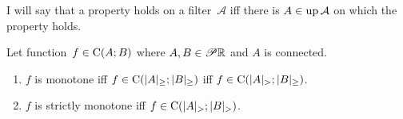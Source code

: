 I will say that a property holds on a filter~$\mathcal{A}$ iff there is $A\in\operatorname{up}\mathcal{A}$ on which the property holds.


\begin{lem}
Let function~$f\in\mathrm{C}(A;B)$ where $A,B\in\mathscr{P}\mathbb{R}$ and $A$ is connected.
\begin{enumerate}
\item $f$ is monotone iff $f\in\mathrm{C}(|A|_{\geq};|B|_{\geq})$ iff
$f\in\mathrm{C}(|A|_{>};|B|_{\geq})$.
\item $f$ is strictly monotone iff $f\in\mathrm{C}(|A|_{>};|B|_{>})$.
\end{enumerate}
\end{lem}

